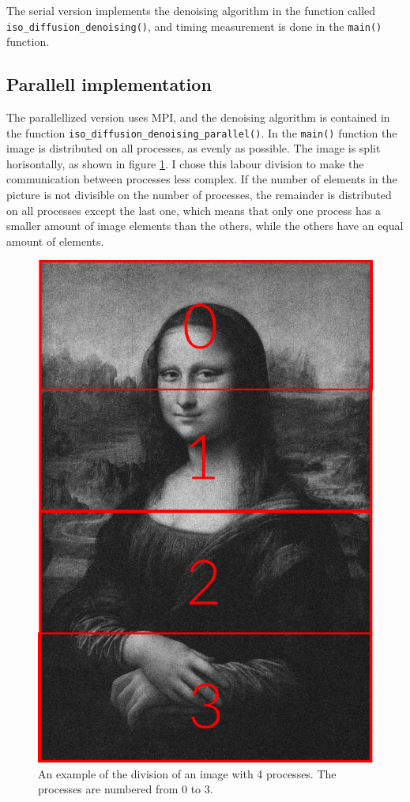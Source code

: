 \documentclass[10pt, a4paper]{amsart}
\numberwithin{figure}{section}
\numberwithin{table}{section}
\begin{document}
The serial version implements the denoising algorithm in the function called \texttt{iso\_diffusion\_denoising()}, and timing measurement is done in the \texttt{main()} function.

\subsection{Parallell implementation}

The parallellized version uses MPI, and the denoising algorithm is contained in the function \texttt{iso\_diffusion\_denoising\_parallel()}. In the \texttt{main()} function the image is distributed on all processes, as evenly as possible. The image is split horisontally, as shown in figure \ref{fig:image_division}. I chose this labour division to make the communication between processes less complex. If the number of elements in the picture is not divisible on the number of processes, the remainder is distributed on all processes except the last one, which means that only one process has a smaller amount of image elements than the others, while the others have an equal amount of elements.

\begin{figure}
    \includegraphics[scale=0.3]{image_division.png}
    \caption{An example of the division of an image with 4 processes. The processes are numbered from 0 to 3.}
    \label{fig:image_division}
\end{figure}
\end{document}

